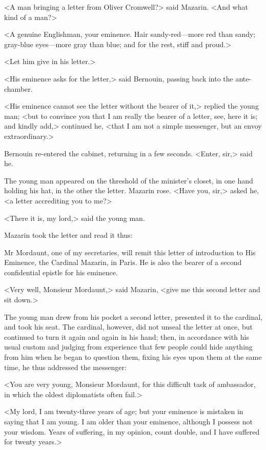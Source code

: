 <A man bringing a letter from Oliver Cromwell?> said Mazarin. <And what kind of a man?>

<A genuine Englishman, your eminence. Hair sandy-red—more red than sandy; gray-blue eyes—more gray than blue; and for the rest, stiff and proud.>

<Let him give in his letter.>

<His eminence asks for the letter,> said Bernouin, passing back into the ante-chamber.

<His eminence cannot see the letter without the bearer of it,> replied the young man; <but to convince you that I am really the bearer of a letter, see, here it is; and kindly add,> continued he, <that I am not a simple messenger, but an envoy extraordinary.>

Bernouin re-entered the cabinet, returning in a few seconds. <Enter, sir,> said he.

The young man appeared on the threshold of the minister's closet, in one hand holding his hat, in the other the letter. Mazarin rose. <Have you, sir,> asked he, <a letter accrediting you to me?>

<There it is, my lord,> said the young man.

Mazarin took the letter and read it thus:  
\vspace{-1.5em}

\begin{mail}{}{}
Mr Mordaunt, one of my secretaries, will remit this letter of introduction to His Eminence, the Cardinal Mazarin, in Paris. He is also the bearer of a second confidential epistle for his eminence. 
\end{mail}

<Very well, Monsieur Mordaunt,> said Mazarin, <give me this second letter and sit down.>

The young man drew from his pocket a second letter, presented it to the cardinal, and took his seat. The cardinal, however, did not unseal the letter at once, but continued to turn it again and again in his hand; then, in accordance with his usual custom and judging from experience that few people could hide anything from him when he began to question them, fixing his eyes upon them at the same time, he thus addressed the messenger:

<You are very young, Monsieur Mordaunt, for this difficult task of ambassador, in which the oldest diplomatists often fail.>

<My lord, I am twenty-three years of age; but your eminence is mistaken in saying that I am young. I am older than your eminence, although I possess not your wisdom. Years of suffering, in my opinion, count double, and I have suffered for twenty years.>

